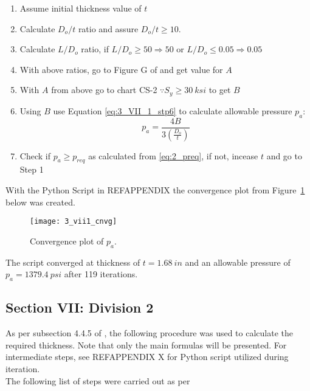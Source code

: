 \begin{enumerate}
	\item Assume initial thickness value of $t$
	\item Calculate $D_o/t$ ratio and assure $D_o/t \geq 10$.
	\item Calculate $L/D_o$ ratio, if $L/D_o \geq 50 \Rightarrow 50$ or  $L/D_o \leq 0.05 \Rightarrow 0.05$
	\item With above ratios, go to Figure G of \citep{ASMEbvpcIID} and get value for $A$
	\item With $A$ from above go to chart CS-2 $\because S_y \geq 30 \ ksi$ to get $B$
	\item Using $B$ use Equation \ref{eq:3_VII_1_stp6} to calculate allowable pressure $p_a$:
		\begin{equation}
			\label{eq:3_VII1_stp6}
			p_a = \frac{4B}{3 \left(\frac{D_o}{t} \right)}
		\end{equation}
	\item Check if $p_a \geq p_{req}$ as calculated from \ref{eq:2_preq}, if not, incease $t$ and go to Step 1
	
\end{enumerate}

With the Python Script in REFAPPENDIX the convergence plot from Figure~\ref{fig:3_vii1_cnvg} below was created.
\begin{figure}[!htbp]
    \centering
    \texttt{[image: 3\_vii1\_cnvg]}
    \caption{Convergence plot of $p_a$.}
    \label{fig:3_vii1_cnvg}
\end{figure}

The script converged at thickness of $t = 1.68\ in$ and an allowable pressure of $p_a = 1379.4\ psi$ after 119 iterations. 


\subsection{Section VII: Division 2}
As per subsection 4.4.5 of \citep{ASMEbvpcVII2}, the following procedure was used to calculate the required thickness. Note that only the main formulas will be presented. For intermediate steps, see REFAPPENDIX X for Python script utilized during iteration.\\

The following list of steps were carried out as per \citep{ASMEbvpcVII2}\\

